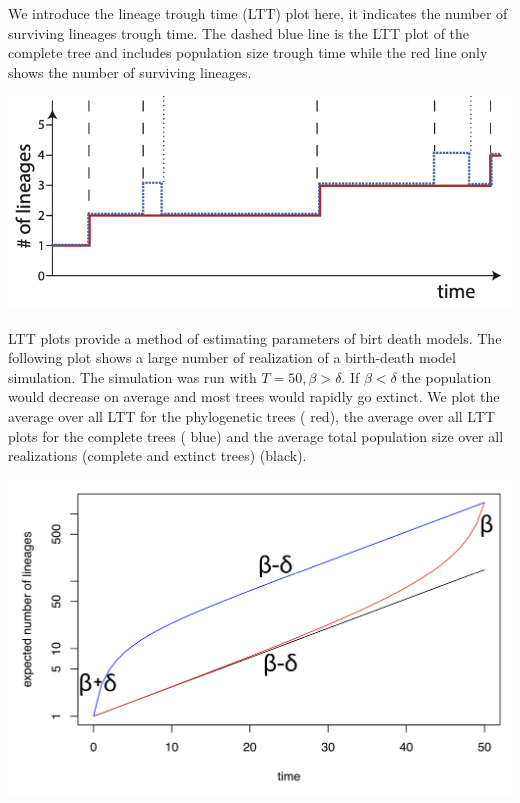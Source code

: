 \documentclass{article}
\begin{document}
\begin{multicols*}{3}
We introduce the lineage trough time (LTT) plot here, it indicates the number of surviving lineages trough time. The dashed blue line is the LTT plot of the complete tree and includes population size trough time while the red line only shows the number of surviving lineages. 

\begin{center}
    \includegraphics[width=0.8\linewidth, angle=0.0]{ltt.png}
\end{center}

LTT plots provide a method of estimating parameters of birt death models. The following plot shows a large number of realization of a birth-death model simulation. The simulation was run with $T = 50, \beta > \delta$. If $\beta < \delta$ the population would decrease on average and most trees would rapidly go extinct. We plot the average over all LTT for the phylogenetic trees ({\color{red} red}), the average over all LTT plots for the complete trees ({\color{blue} blue}) and the average total population size over all realizations (complete and extinct trees) (black).

\begin{center}
    \includegraphics[width=1\linewidth, angle=0.0]{lttavg.png}
\end{center}


\end{multicols*}
\end{document}
